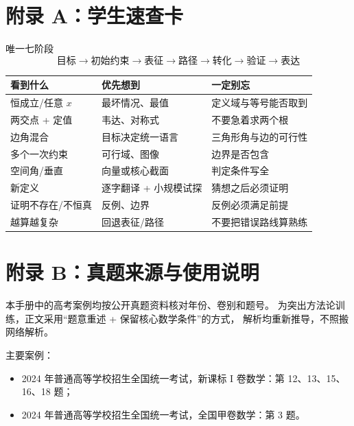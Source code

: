\documentclass[11pt,a4paper]{ctexart}
\begin{document}
\section{附录 A：学生速查卡}

\begin{corebox}{唯一七阶段}
\[
\boxed{
\text{目标}
\rightarrow
\text{初始约束}
\rightarrow
\text{表征}
\rightarrow
\text{路径}
\rightarrow
\text{转化}
\rightarrow
\text{验证}
\rightarrow
\text{表达}}
\]
\end{corebox}

\begin{longtable}{p{2.5cm}p{5.4cm}p{6.6cm}}
\toprule
\textbf{看到什么} & \textbf{优先想到} & \textbf{一定别忘}\\
\midrule
恒成立/任意 $x$ & 最坏情况、最值 & 定义域与等号能否取到\\ \hline
两交点 + 定值 & 韦达、对称式 & 不要急着求两个根\\ \hline
边角混合 & 目标决定统一语言 & 三角形角与边的可行性\\ \hline
多个一次约束 & 可行域、图像 & 边界是否包含\\ \hline
空间角/垂直 & 向量或核心截面 & 判定条件写全\\ \hline
新定义 & 逐字翻译 + 小规模试探 & 猜想之后必须证明\\ \hline
证明不存在/不恒真 & 反例、边界 & 反例必须满足前提\\ \hline
越算越复杂 & 回退表征/路径 & 不要把错误路线算熟练\\
\bottomrule
\end{longtable}

\section{附录 B：真题来源与使用说明}

本手册中的高考案例均按公开真题资料核对年份、卷别和题号。
为突出方法论训练，正文采用“题意重述 + 保留核心数学条件”的方式，
解析均重新推导，不照搬网络解析。

主要案例：
\begin{itemize}
  \item 2024 年普通高等学校招生全国统一考试，新课标 I 卷数学：第 12、13、15、16、18 题；
  \item 2024 年普通高等学校招生全国统一考试，全国甲卷数学：第 3 题。
\end{itemize}
\end{document}

